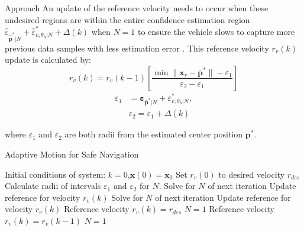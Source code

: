 \begin{section}{Approach}
An update of the reference velocity needs to occur when these undesired regions are within the entire confidence estimation region $ \hat{\varepsilon}_{\hat{\bar{\bm{p}}}^*|N} +\hat{\varepsilon}_{v,\theta_h|N}^{*}+\Delta(k)$ when $N=1$ to ensure the vehicle slows to capture more previous data samples with less estimation error . This reference velocity $r_v(k)$ update is calculated by:
    \begin{equation}
	    r_v(k)=r_v(k-1) \left[ \frac{ \min \lVert \bm{x}_r - \bar{\bm{p}}^* \rVert - \varepsilon_1}{\varepsilon_2 - \varepsilon_1} \right]
	\end{equation}
	\begin{equation}
	\begin{split}
	    \varepsilon_1&=\bm{\varepsilon}_{\bar{\bm{p}}^*|N} +\varepsilon_{v,\theta_h|N}^{*},\\ &\varepsilon_2=\varepsilon_1+\Delta(k) \nonumber	    
	\end{split}
	\end{equation}
	
where $\varepsilon_1$ and $\varepsilon_2$ are both radii from the estimated center position $\bar{\bm{p}}^*$.
	


\begin{algorithm}
   \caption{Adaptive Motion for Safe Navigation} 
   \label{alg:adapt_motion} 
    \begin{algorithmic}[1]
	\State Initial conditions of system: $k=0$,$\bm{x}(0)=\bm{x}_0$
	\State Set $r_v(0)$ to desired velocity $r_{des}$
        \State {}
        \State Calculate radii of intervals $\varepsilon_1$ and $\varepsilon_2$ for $N$.
            \State Solve for $N$ of next iteration
            \State Update reference for velocity $r_v(k)$
        \Else
                \State Solve for $N$ of next iteration
                \State Update reference for velocity $r_v(k)$
            \Else
                    \State Reference velocity $r_v(k)=r_{des}$
                    \State $N = 1$
                \Else
                    \State Reference velocity $r_v(k) = r_v(k-1)$
                    \State $N = 1$
                \EndIf
            \EndIf
        \EndIf
    \EndWhile
	\end{algorithmic}
\end{algorithm}



\end{section} 